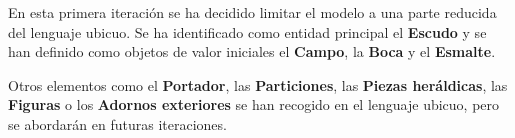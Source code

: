 En esta primera iteración se ha decidido limitar el modelo a una parte reducida del lenguaje ubicuo. 
Se ha identificado como entidad principal el \textbf{Escudo} y se han definido como objetos de valor 
iniciales el \textbf{Campo}, la \textbf{Boca} y el \textbf{Esmalte}. 

Otros elementos como el \textbf{Portador}, las \textbf{Particiones}, las \textbf{Piezas heráldicas}, 
las \textbf{Figuras} o los \textbf{Adornos exteriores} se han recogido en el lenguaje ubicuo, pero se 
abordarán en futuras iteraciones.

